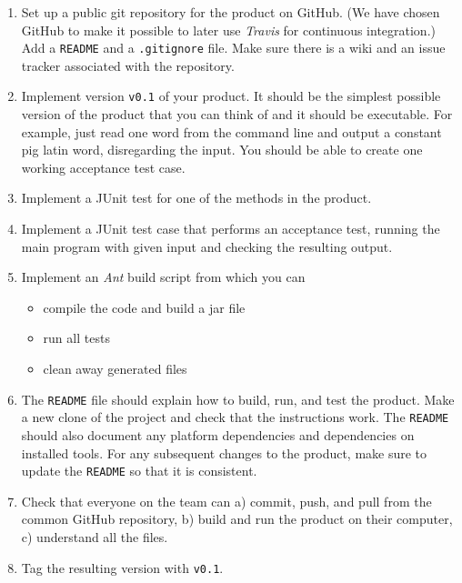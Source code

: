 \documentclass[swedish,english]{article}
\begin{document}
\begin{enumerate}

\item Set up a public git repository for the product on GitHub. (We have chosen GitHub to make it possible to later use \emph{Travis} for continuous integration.) Add a \verb'README' and a \verb'.gitignore' file. Make sure there is a wiki and an issue tracker associated with the repository.

\item Implement version \verb'v0.1' of your product. It should be the simplest possible version of the product that you can think of and it should be executable. For example, just read one word from the command line and output a constant pig latin word, disregarding the input. You should be able to create one working acceptance test case.

\item Implement a JUnit test for one of the methods in the  product.

\item Implement a JUnit test case that performs an acceptance test, running the main program with given input and checking the resulting output.

\item Implement an \emph{Ant} build script from which you can
\begin{itemize}
  \item compile the code and build a jar file
  \item run all tests
  \item clean away generated files
\end{itemize}

\item The \verb'README' file should explain how to build, run, and test the product. Make a new clone of the project and check that the instructions work. The \verb'README' should also document any platform dependencies and dependencies on installed tools. For any subsequent changes to the product, make sure to update the \verb'README' so that it is consistent.

\item Check that everyone on the team can a) commit, push, and pull from the common GitHub repository, b) build and run the product on their computer, c) understand all the files.

\item Tag the resulting version with \verb'v0.1'.


\end{enumerate}
\end{document}
